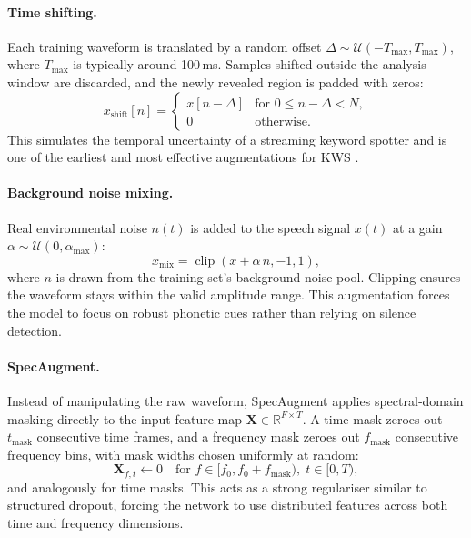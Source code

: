 \documentclass[11pt]{article}
\begin{document}
\paragraph{Time shifting.}
Each training waveform is translated by a random offset $\Delta \sim \mathcal{U}(-T_{\max}, T_{\max})$, where $T_{\max}$ is typically around 100 ms. 
Samples shifted outside the analysis window are discarded, and the newly revealed region is padded with zeros:
\begin{equation}
    x_{\text{shift}}[n] = \begin{cases}
        x[n - \Delta] & \text{for } 0 \le n-\Delta < N,\\
        0 & \text{otherwise}.
    \end{cases}
\end{equation}
This simulates the temporal uncertainty of a streaming keyword spotter and is one of the earliest and most effective augmentations for KWS \cite{speechcommands,tcnn}.

\paragraph{Background noise mixing.}
Real environmental noise $n(t)$ is added to the speech signal $x(t)$ at a gain $\alpha \sim \mathcal{U}(0, \alpha_{\max})$:
\begin{equation}
    x_{\text{mix}} = \operatorname{clip}(x + \alpha\, n, -1, 1),
\end{equation}
where $n$ is drawn from the training set’s background noise pool. 
Clipping ensures the waveform stays within the valid amplitude range. 
This augmentation forces the model to focus on robust phonetic cues rather than relying on silence detection.

\paragraph{SpecAugment.}
Instead of manipulating the raw waveform, SpecAugment \cite{specaugment} applies spectral‑domain masking directly to the input feature map $\mathbf{X} \in \mathbb{R}^{F \times T}$. 
A time mask zeroes out $t_{\text{mask}}$ consecutive time frames, and a frequency mask zeroes out $f_{\text{mask}}$ consecutive frequency bins, with mask widths chosen uniformly at random:
\begin{equation}
    \mathbf{X}_{f, t} \leftarrow 0 \quad \text{for } f \in [f_0, f_0 + f_{\text{mask}}),\; t \in [0, T),
\end{equation}
and analogously for time masks. 
This acts as a strong regulariser similar to structured dropout, forcing the network to use distributed features across both time and frequency dimensions.
\end{document}
